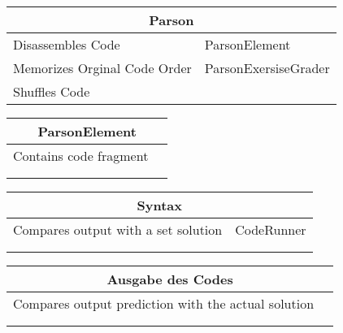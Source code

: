\documentclass[11pt]{article}
\begin{document}
\begin{table}[h]
\begin{tabularx}{\textwidth}{|X|X|}
\hline
\multicolumn{2}{|c|}{Parson}\\ \hline
Disassembles Code& ParsonElement  \\  \hline
Memorizes Orginal Code Order & ParsonExersiseGrader\\ \hline
Shuffles Code & \\ \hline
\end{tabularx}

\end{table}


\begin{table}[h]
\begin{tabularx}{\textwidth}{|X|X|}
\hline
\multicolumn{2}{|c|}{ParsonElement}\\ \hline
Contains code fragment& \\  \hline
 & \\ \hline
 & \\ \hline
\end{tabularx}

\end{table}


\begin{table}[h]
\begin{tabularx}{\textwidth}{|X|X|}
\hline
\multicolumn{2}{|c|}{Syntax}\\ \hline
Compares output with a set solution& CodeRunner \\  \hline
 &  \\ \hline
 & \\ \hline
\end{tabularx}

\end{table}


\begin{table}[h]
\begin{tabularx}{\textwidth}{|X|X|}
\hline
\multicolumn{2}{|c|}{Ausgabe des Codes}\\ \hline
Compares output prediction with the actual solution&  \\  \hline
 &  \\ \hline
 & \\ \hline
\end{tabularx}

\end{table}
\end{document}
